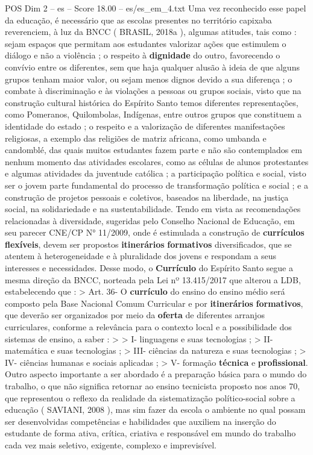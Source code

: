 \begin{textsample}{POS Dim 2 – es – Score 18.00 – es/es\_em\_4.txt}
Uma vez reconhecido esse papel da educação, é necessário que as escolas presentes no território capixaba reverenciem, à luz da BNCC ( BRASIL, 2018a ), algumas atitudes, tais como : sejam espaços que permitam aos estudantes valorizar ações que estimulem o diálogo e não a violência ; o respeito à \textbf{dignidade} do outro, favorecendo o convívio entre os diferentes, sem que haja qualquer alusão à ideia de que alguns grupos tenham maior valor, ou sejam menos dignos devido a sua diferença ; o combate à discriminação e às violações a pessoas ou grupos sociais, visto que na construção cultural histórica do Espírito Santo temos diferentes representações, como Pomeranos, Quilombolas, Indígenas, entre outros grupos que constituem a identidade do estado ; o respeito e a valorização de diferentes manifestações religiosas, a exemplo das religiões de matriz africana, como umbanda e candomblé, das quais muitos estudantes fazem parte e não são contemplados em nenhum momento das atividades escolares, como as células de alunos protestantes e algumas atividades da juventude católica ; a participação política e social, visto ser o jovem parte fundamental do processo de transformação política e social ; e a construção de projetos pessoais e coletivos, baseados na liberdade, na justiça social, na solidariedade e na sustentabilidade.
Tendo em vista as recomendações relacionadas à diversidade, sugeridas pelo Conselho Nacional de Educação, em seu parecer CNE/CP N{\EmojiFont °} 11/2009, onde é estimulada a construção de \textbf{currículos} \textbf{flexíveis}, devem ser propostos \textbf{itinerários} \textbf{formativos} diversificados, que se atentem à heterogeneidade e à pluralidade dos jovens e respondam a seus interesses e necessidades.
Desse modo, o \textbf{Currículo} do Espírito Santo segue a mesma direção da BNCC, norteada pela Lei nº 13.415/2017 que alterou a LDB, estabelecendo que : > Art. 36- O \textbf{currículo} do ensino do ensino médio será composto pela Base Nacional Comum Curricular e por \textbf{itinerários} \textbf{formativos}, que deverão ser organizados por meio da \textbf{oferta} de diferentes arranjos curriculares, conforme a relevância para o contexto local e a possibilidade dos sistemas de ensino, a saber : > > I- linguagens e suas tecnologias ; > II- matemática e suas tecnologias ; > III- ciências da natureza e suas tecnologias ; > IV- ciências humanas e sociais aplicadas ; > V- formação \textbf{técnica} e \textbf{profissional}.
Outro aspecto importante a ser abordado é a preparação básica para o mundo do trabalho, o que não significa retornar ao ensino tecnicista proposto nos anos 70, que representou o reflexo da realidade da sistematização político-social sobre a educação ( SAVIANI, 2008 ), mas sim fazer da escola o ambiente no qual possam ser desenvolvidas competências e habilidades que auxiliem na inserção do estudante de forma ativa, crítica, criativa e responsável em mundo do trabalho cada vez mais seletivo, exigente, complexo e imprevisível.

\end{textsample}
